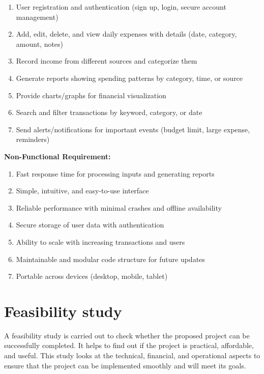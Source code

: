 \documentclass[12pt]{report} %
\begin{document}
\begin{enumerate}[label=\roman*., topsep=2pt, partopsep=0pt, itemsep=2pt, parsep=0pt]
    \renewcommand{\labelenumi}{\roman{enumi}.}
    \item User registration and authentication (sign up, login, secure account management)
    \item Add, edit, delete, and view daily expenses with details (date, category, amount, notes)
    \item Record income from different sources and categorize them
    \item Generate reports showing spending patterns by category, time, or source
    \item Provide charts/graphs for financial visualization
    \item Search and filter transactions by keyword, category, or date
    \item Send alerts/notifications for important events (budget limit, large expense, reminders)
\end{enumerate}

\noindent
\textbf{Non-Functional Requirement:}
\begin{enumerate}[label=\roman*., topsep=2pt, partopsep=0pt, itemsep=2pt, parsep=0pt]
    \renewcommand{\labelenumi}{\roman{enumi}.}
    \item Fast response time for processing inputs and generating reports
    \item Simple, intuitive, and easy-to-use interface
    \item Reliable performance with minimal crashes and offline availability
    \item Secure storage of user data with authentication
    \item Ability to scale with increasing transactions and users
    \item Maintainable and modular code structure for future updates
    \item Portable across devices (desktop, mobile, tablet)
\end{enumerate}

\newpage

\section{Feasibility study}
A feasibility study is carried out to check whether the proposed project can be successfully completed. It helps to find out if the project is practical, affordable, and useful. This study looks at the technical, financial, and operational aspects to ensure that the project can be implemented smoothly and will meet its goals.
\end{document}
